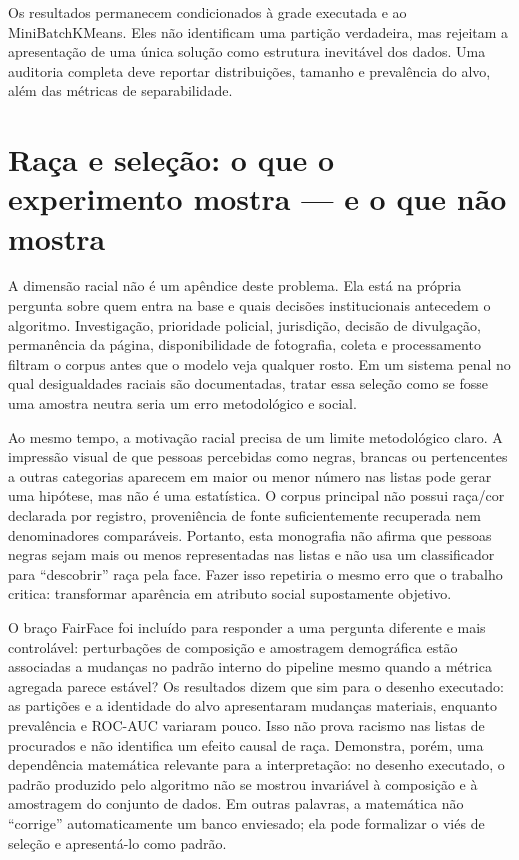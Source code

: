 Os resultados permanecem condicionados à grade executada e ao MiniBatchKMeans. Eles não identificam uma partição verdadeira, mas rejeitam a apresentação de uma única solução como estrutura inevitável dos dados. Uma auditoria completa deve reportar distribuições, tamanho e prevalência do alvo, além das métricas de separabilidade.

\section{Raça e seleção: o que o experimento mostra --- e o que não mostra}

A dimensão racial não é um apêndice deste problema. Ela está na própria pergunta sobre quem entra na base e quais decisões institucionais antecedem o algoritmo. Investigação, prioridade policial, jurisdição, decisão de divulgação, permanência da página, disponibilidade de fotografia, coleta e processamento filtram o corpus antes que o modelo veja qualquer rosto. Em um sistema penal no qual desigualdades raciais são documentadas, tratar essa seleção como se fosse uma amostra neutra seria um erro metodológico e social.

Ao mesmo tempo, a motivação racial precisa de um limite metodológico claro. A impressão visual de que pessoas percebidas como negras, brancas ou pertencentes a outras categorias aparecem em maior ou menor número nas listas pode gerar uma hipótese, mas não é uma estatística. O corpus principal não possui raça/cor declarada por registro, proveniência de fonte suficientemente recuperada nem denominadores comparáveis. Portanto, esta monografia não afirma que pessoas negras sejam mais ou menos representadas nas listas e não usa um classificador para ``descobrir'' raça pela face. Fazer isso repetiria o mesmo erro que o trabalho critica: transformar aparência em atributo social supostamente objetivo.

O braço FairFace foi incluído para responder a uma pergunta diferente e mais controlável: perturbações de composição e amostragem demográfica estão associadas a mudanças no padrão interno do pipeline mesmo quando a métrica agregada parece estável? Os resultados dizem que sim para o desenho executado: as partições e a identidade do alvo apresentaram mudanças materiais, enquanto prevalência e ROC-AUC variaram pouco. Isso não prova racismo nas listas de procurados e não identifica um efeito causal de raça. Demonstra, porém, uma dependência matemática relevante para a interpretação: no desenho executado, o padrão produzido pelo algoritmo não se mostrou invariável à composição e à amostragem do conjunto de dados. Em outras palavras, a matemática não ``corrige'' automaticamente um banco enviesado; ela pode formalizar o viés de seleção e apresentá-lo como padrão.

